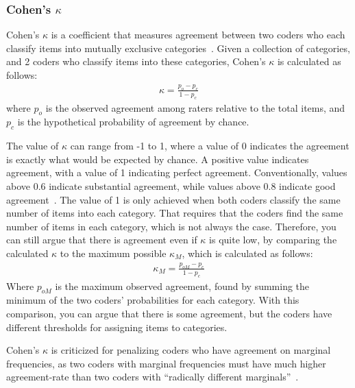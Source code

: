 \subsubsection*{Cohen's \(\kappa \)}
Cohen's \(\kappa \) is a coefficient that measures agreement between two coders who each classify items into mutually exclusive categories~\cite{cohen_coefficient_1960}. Given a collection of categories, and 2 coders who classify items into these categories, Cohen's \(\kappa \) is calculated as follows:
\begin{align}
    \kappa = \frac{p_o - p_c}{1 - p_c}
\end{align}
where \(p_o\) is the observed agreement among raters relative to the total items, and \(p_c\) is the hypothetical probability of agreement by chance.

The value of \(\kappa \) can range from -1 to 1, where a value of 0 indicates the agreement is exactly what would be expected by chance. A positive value indicates agreement, with a value of 1 indicating perfect agreement. Conventionally, values above 0.6 indicate substantial agreement, while values above 0.8 indicate good agreement~\cite{pandey_deductive_2019}. The value of 1 is only achieved when both coders classify the same number of items into each category. That requires that the coders find the same number of items in each category, which is not always the case. Therefore, you can still argue that there is agreement even if \(\kappa \) is quite low, by comparing the calculated \(\kappa \) to the maximum possible \(\kappa_M\), which is calculated as follows:
\begin{align}
    \kappa_M = \frac{p_{oM}-p_c}{1-p_c}
\end{align}
Where \(p_{oM}\) is the maximum observed agreement, found by summing the minimum of the two coders' probabilities for each category. With this comparison, you can argue that there is some agreement, but the coders have different thresholds for assigning items to categories.

Cohen's \(\kappa \) is criticized for penalizing coders who have agreement on marginal frequencies, as two coders with marginal frequencies must have much higher agreement-rate than two coders with ``radically different marginals''~\cite{krippendorff_content_2004}.

